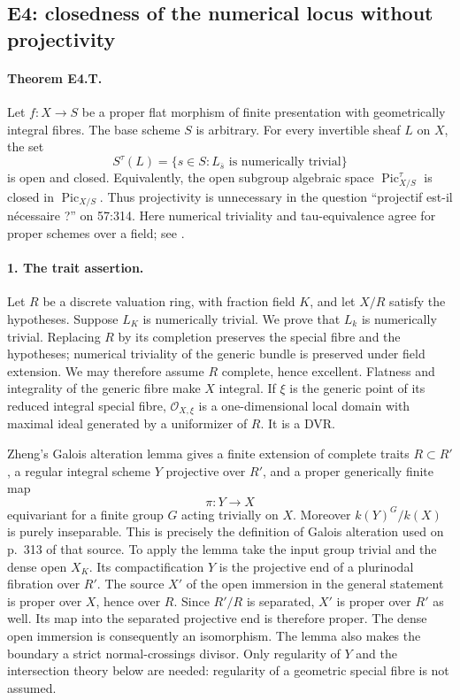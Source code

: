 \subsection{E4: closedness of the numerical locus without projectivity}

\paragraph{Theorem E4.T.}
Let $f:X\to S$ be a proper flat morphism of finite presentation with
geometrically integral fibres. The base scheme $S$ is arbitrary. For every
invertible sheaf $L$ on $X$, the set
\[
 S^\tau(L)=\{s\in S:L_{\bar s}\text{ is numerically trivial}\}
                                                        \tag{E4.T.1}
\]
is open and closed. Equivalently, the open subgroup algebraic space
$\operatorname{Pic}^{\tau}_{X/S}$ is closed in
$\operatorname{Pic}_{X/S}$. Thus projectivity is unnecessary in the
question ``projectif est-il n\'ecessaire ?'' on 57:314. Here numerical
triviality and tau-equivalence agree for proper schemes over a field;
see \cite[Remark~6.14, pp.~57--58]{Kleiman2005}.

\paragraph{1. The trait assertion.}
Let $R$ be a discrete valuation ring, with fraction field $K$, and let
$X/R$ satisfy the hypotheses. Suppose $L_K$ is numerically trivial.
We prove that $L_k$ is numerically trivial. Replacing $R$ by its completion
preserves the special fibre and the hypotheses; numerical triviality of
the generic bundle is preserved under field extension. We may therefore
assume $R$ complete, hence excellent. Flatness and integrality of the generic
fibre make $X$ integral. If $\xi$ is the generic point of its reduced
integral special fibre, $\mathcal O_{X,\xi}$ is a one-dimensional local
domain with maximal ideal generated by a uniformizer of $R$. It is a DVR.

Zheng's Galois alteration lemma
\cite[Lemma~3.8, pp.~313--314]{BCEZheng2009} gives a finite extension of
complete traits $R\subset R'$, a regular integral scheme $Y$ projective
over $R'$, and a proper generically finite map
\[
 \pi:Y\longrightarrow X
\]
equivariant for a finite group $G$ acting trivially on $X$. Moreover
$k(Y)^G/k(X)$ is purely inseparable. This is precisely the definition of
Galois alteration used on p.~313 of that source. To apply the lemma take
the input group trivial and the dense open $X_K$. Its compactification
$Y$ is the projective end of a plurinodal fibration over $R'$. The source
$X'$ of the open immersion in the general statement is proper over $X$,
hence over $R$. Since $R'/R$ is separated, $X'$ is proper over $R'$ as
well. Its map into the separated projective end is therefore proper.
The dense open immersion is consequently an isomorphism. The lemma also makes the
boundary a strict normal-crossings divisor. Only regularity of $Y$ and
the intersection theory below are needed: regularity of a geometric
special fibre is not assumed.

